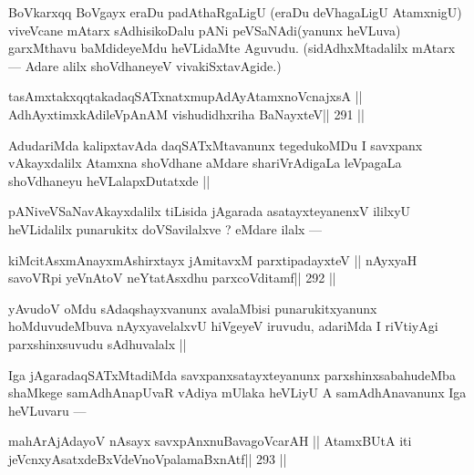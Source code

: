 \begin{artha}
BoVkarxqq BoVgayx eraDu padAthaRgaLigU (eraDu deVhagaLigU AtamxnigU) viveVcane mAtarx sAdhisikoDalu pANi peVSaNAdi(yanunx heVLuva) garxMthavu baMdideyeMdu heVLidaMte Aguvudu. (sidAdhxMtadalilx mAtarx --- Adare alilx shoVdhaneyeV vivakiSxtavAgide.)
\end{artha}

\begin{shl}
\footnotemark[3]tasAmxtakxqqtakadaqSATxnatxmupAdAyA\s\s tamxnoV\s cnajxsA ||
AdhAyxtimxkAdileVpAnAM vishudidhxriha BaNayxteV\hfill || 291 ||
\end{shl}

\begin{artha}
AdudariMda kalipxtavAda daqSATxMtavanunx tegedukoMDu I savxpanx vAkayxdalilx Atamxna shoVdhane aMdare shariVrAdigaLa leVpagaLa shoVdhaneyu heVLalapxDutatxde ||
\end{artha}

\begin{artha}
pANiveVSaNavAkayxdalilx tiLisida jAgarada asatayxteyanenxV ililxyU heVLidalilx punarukitx doVSavilalxve ? eMdare ilalx ---
\end{artha}

\begin{shl}
kiMcitAsxmAnayxmAshirxtayx jAmitavxM parxtipadayxteV ||
nAyxyaH savoVR\s pi yeVnAtoV neYtatAsxdhu parxcoVditamf\hfill || 292 ||
\end{shl}

\begin{artha}
yAvudoV oMdu sAdaqshayxvanunx avalaMbisi punarukitxyanunx hoMduvudeMbuva nAyxyavelalxvU hiVgeyeV iruvudu, adariMda I riVtiyAgi parxshinxsuvudu sAdhuvalalx ||
\end{artha}

\begin{artha}
Iga jAgaradaqSATxMtadiMda savxpanxsatayxteyanunx parxshinxsabahudeMba shaMkege samAdhAnapUvaR vAdiya mUlaka heVLiyU A samAdhAnavanunx Iga heVLuvaru ---
\end{artha}

\begin{shl}
mahArAjAdayoV nAsayx savxpAnxnuBavagoVcarAH ||
AtamxBUtA iti jeVcnxyAsatxdeBxVdeVnoVpalamaBxnAtf\hfill || 293 ||
\end{shl}

